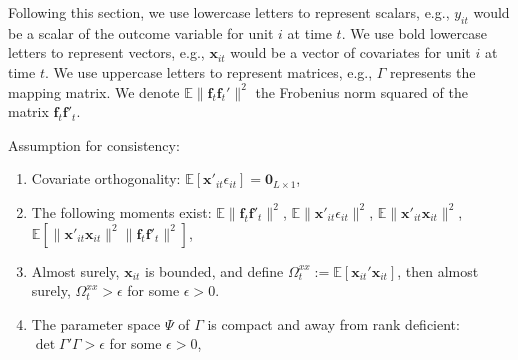 \documentclass[12pt]{article}
\begin{document}
Following this section, we use lowercase letters to represent scalars, e.g., $y_{it}$ would be a scalar of the outcome variable for unit $i$ at time $t$. We use bold lowercase letters to represent vectors, e.g., $\bm{x}_{it}$ would be a vector of covariates for unit $i$ at time $t$. We use uppercase letters to represent matrices, e.g., $\Gamma$ represents the mapping matrix. We denote $\mathbb{E}\|\bm{f}_t\bm{f}_t'\|^2$ the Frobenius norm squared of the matrix $\bm{f}_t\bm{f}'_t$.

\begin{assumption}
Assumption for consistency:
\begin{enumerate}
    \item Covariate orthogonality: $\mathbb{E}\left[\textbf{x}'_{it} \epsilon_{it}\right] = \textbf{0}_{L\times 1}$,
    
    \item The following moments exist: $\mathbb{E}\|\bm{f}_{t}\bm{f}'_{t}\|^2$, $\mathbb{E}\|\bm{x}'_{it}\epsilon_{it}\|^2$, $\mathbb{E}\|\bm{x}'_{it}\bm{x}_{it}\|^2$, $\mathbb{E}\left[\|\bm{x}'_{it}\bm{x}_{it}\|^2\|\bm{f}_{t}\bm{f}'_{t}\|^2 \right]$, 

    \item Almost surely, $\bm{x}_{it}$ is bounded, and define $\Omega_t^{xx} := \mathbb{E}\left[ \bm{x}_{it}' \bm{x}_{it} \right]$, then almost surely, $\Omega_t^{xx} > \epsilon$ for some $\epsilon > 0$.
    
    \item The parameter space $\Psi$ of $\Gamma$ is compact and away from rank deficient: $\det{\Gamma' \Gamma} > \epsilon$ for some $\epsilon>0$,
    
\end{enumerate}
\label{app: ass consistency}
\end{assumption}
\end{document}
